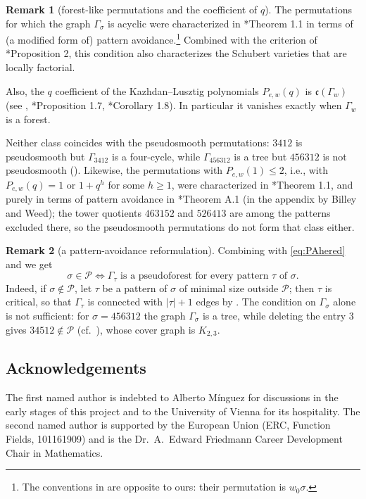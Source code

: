 \documentclass[12pt]{article}
\def\xspace{ }%
\theoremstyle{definition}
\newtheorem{remark}[remark]{Remark}
\newcommand{\psm}{pseudosmooth\xspace}
\newcommand{\wo}{w_0}                 %
\newcommand{\PA}{\mathcal{P}}          %
\newcommand{\cyc}{\mathfrak{c}}            %
\newcommand{\cgr}{\Gamma}                 %
\begin{document}
\begin{remark}[forest-like permutations and the coefficient of $q$]\label{rem:forest}
The permutations for which the graph $\cgr_\sigma$ is acyclic were
characterized in \cite{MR2376109}*{Theorem 1.1} in terms of (a modified form of) pattern avoidance.\footnote{The
conventions in \cite{MR2376109} are opposite to ours: their permutation is $\wo\sigma$.}
Combined with the criterion of \cite{MR2264071}*{Proposition 2}, this condition
also characterizes the Schubert varieties that are locally factorial.

Also, the $q$ coefficient of the Kazhdan--Lusztig polynomials $P_{e,w}(q)$
is $\cyc(\cgr_w)$ (see \cite{MR1635681}, \cite{MR1317469}*{Proposition 1.7},
\cite{MR1279583}*{Corollary 1.8}). In particular it vanishes exactly when
$\cgr_w$ is a forest.

Neither class coincides with the \psm permutations: $3412$ is \psm but $\cgr_{3412}$ is a
four-cycle, while $\cgr_{456312}$ is a tree but $456312$ is not \psm ().
Likewise, the permutations with $P_{e,w}(1) \le 2$, i.e., with $P_{e,w}(q) = 1$ or $1+q^h$ for some $h\ge1$,
were characterized in \cite{MR2515773}*{Theorem 1.1}, and purely in terms of pattern avoidance
in \cite{MR2515773}*{Theorem A.1} (in the appendix by Billey and Weed);
the tower quotients $463152$ and $526413$ are among the patterns excluded there, so the \psm permutations do
not form that class either.
\end{remark}

\begin{remark}[a pattern-avoidance reformulation]\label{rem:PApattern}
Combining  with \eqref{eq:PAhered} and  we get
\[
   \sigma \in \PA \iff \cgr_\tau \text{ is a pseudoforest for every pattern $\tau$ of $\sigma$.}
\]
Indeed, if $\sigma \notin \PA$, let $\tau$ be a pattern of $\sigma$ of minimal size outside $\PA$;
then $\tau$ is critical, so that $\cgr_\tau$ is
connected with $|\tau|+1$ edges by .
The condition on $\cgr_\sigma$ alone is not sufficient: for $\sigma = 456312$ the graph $\cgr_\sigma$ is a tree,
while deleting the entry $3$ gives $34512 \notin \PA$ (cf.\ ), whose cover graph is $K_{2,3}$.
\end{remark}

\subsection*{Acknowledgements}
The first named author is indebted to Alberto M\'inguez for discussions in the early stages of this project
and to the University of Vienna for its hospitality.
The second named author is supported by the European Union (ERC, Function Fields, 101161909)
and is the Dr.~A.~Edward Friedmann Career Development Chair in Mathematics.
\end{document}
